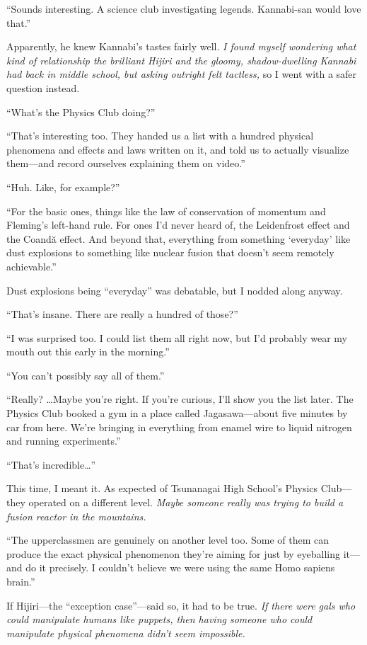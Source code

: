 \documentclass[
    a4paper,
    12pt,
    twoside,
    openany,
    UTF8,
    fontset=windows
]{ctexbook}
\begin{document}
``Sounds interesting. A science club investigating legends. Kannabi-san would love that.''

Apparently, he knew Kannabi's tastes fairly well. \textit{I found myself wondering what kind of relationship the brilliant Hijiri and the gloomy, shadow-dwelling Kannabi had back in middle school, but asking outright felt tactless,} so I went with a safer question instead.

``What's the Physics Club doing?''

``That's interesting too. They handed us a list with a hundred physical phenomena and effects and laws written on it, and told us to actually visualize them---and record ourselves explaining them on video.''

``Huh. Like, for example?''

``For the basic ones, things like the law of conservation of momentum and Fleming's left-hand rule. For ones I'd never heard of, the Leidenfrost effect and the Coand\u{a} effect. And beyond that, everything from something `everyday' like dust explosions to something like nuclear fusion that doesn't seem remotely achievable.''

Dust explosions being ``everyday'' was debatable, but I nodded along anyway.

``That's insane. There are really a hundred of those?''

``I was surprised too. I could list them all right now, but I'd probably wear my mouth out this early in the morning.''

``You can't possibly say all of them.''

``Really? \dots Maybe you're right. If you're curious, I'll show you the list later. The Physics Club booked a gym in a place called Jagasawa---about five minutes by car from here. We're bringing in everything from enamel wire to liquid nitrogen and running experiments.''

``That's incredible\dots''

This time, I meant it. As expected of Tsunanagai High School's Physics Club---they operated on a different level. \textit{Maybe someone really was trying to build a fusion reactor in the mountains.}

``The upperclassmen are genuinely on another level too. Some of them can produce the exact physical phenomenon they're aiming for just by eyeballing it---and do it precisely. I couldn't believe we were using the same Homo sapiens brain.''

If Hijiri---the ``exception case''---said so, it had to be true. \textit{If there were gals who could manipulate humans like puppets, then having someone who could manipulate physical phenomena didn't seem impossible.}
\end{document}
